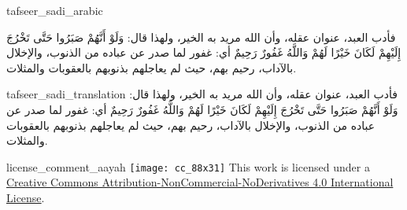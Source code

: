\begin{taggedblock}{tafseer_sadi_arabic}
\begin{Arabic}
فأدب العبد، عنوان عقله، وأن الله مريد به الخير، ولهذا قال:
{ وَلَوْ أَنَّهُمْ صَبَرُوا حَتَّى تَخْرُجَ إِلَيْهِمْ لَكَانَ خَيْرًا لَهُمْ وَاللَّهُ غَفُورٌ رَحِيمٌ }
أي: غفور لما صدر عن عباده من الذنوب، والإخلال بالآداب، رحيم بهم، حيث لم يعاجلهم بذنوبهم بالعقوبات والمثلات.
\end{Arabic}
\end{taggedblock}
\begin{taggedblock}{tafseer_sadi_translation}
فأدب العبد، عنوان عقله، وأن الله مريد به الخير، ولهذا قال:
{ وَلَوْ أَنَّهُمْ صَبَرُوا حَتَّى تَخْرُجَ إِلَيْهِمْ لَكَانَ خَيْرًا لَهُمْ وَاللَّهُ غَفُورٌ رَحِيمٌ }
أي: غفور لما صدر عن عباده من الذنوب، والإخلال بالآداب، رحيم بهم، حيث لم يعاجلهم بذنوبهم بالعقوبات والمثلات.
\end{taggedblock}
\begin{taggedblock}{license_comment_aayah}
\texttt{[image: cc\_88x31]}
This work is licensed under a 
\href{http://creativecommons.org/licenses/by-nc-nd/4.0/}{Creative Commons Attribution-NonCommercial-NoDerivatives 4.0 International License}.
\end{taggedblock}
\begin{comment}
Please use the following for footnotes:- Sample\footnoteQ{Text of Qur'an footnote goes here.}.
Sample\footnoteT{Text of Tafseer footnote goes here.}.
\end{comment}